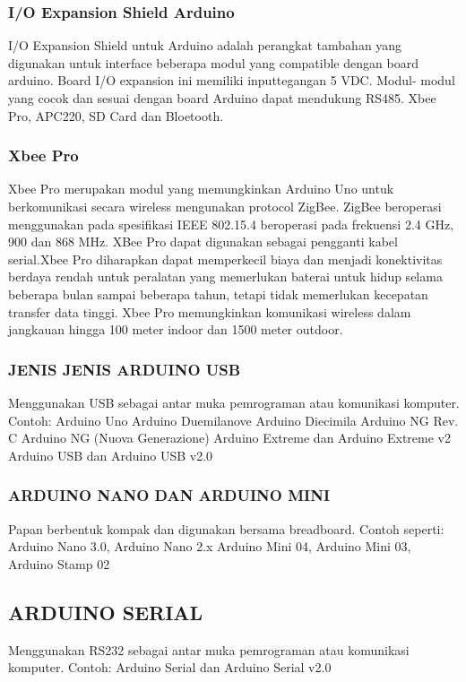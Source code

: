 \subsubsection  {I/O Expansion Shield Arduino}
I/O Expansion Shield untuk Arduino adalah perangkat tambahan yang digunakan untuk interface beberapa modul yang compatible dengan board arduino. Board I/O expansion ini memiliki inputtegangan 5 VDC. Modul- modul yang cocok dan sesuai dengan board Arduino dapat mendukung RS485. Xbee Pro, APC220, SD Card dan Bloetooth.

\subsubsection {Xbee Pro}
 Xbee Pro merupakan modul yang memungkinkan Arduino Uno untuk berkomunikasi secara wireless
mengunakan protocol ZigBee. ZigBee beroperasi menggunakan pada spesifikasi IEEE 802.15.4 beroperasi pada frekuensi
2.4 GHz, 900 dan 868 MHz. XBee Pro dapat digunakan sebagai pengganti kabel serial.Xbee Pro diharapkan dapat memperkecil biaya dan menjadi
konektivitas berdaya rendah untuk peralatan yang memerlukan baterai untuk hidup selama beberapa bulan sampai beberapa tahun, tetapi tidak memerlukan kecepatan transfer data tinggi. Xbee Pro memungkinkan komunikasi wireless dalam jangkauan hingga 100 meter indoor dan 1500 meter outdoor.


\subsubsection {JENIS JENIS ARDUINO USB}
Menggunakan USB sebagai antar muka pemrograman atau komunikasi komputer. Contoh:
Arduino Uno
Arduino Duemilanove
Arduino Diecimila
Arduino NG Rev. C
Arduino NG (Nuova Generazione)
Arduino Extreme dan Arduino Extreme v2
Arduino USB dan Arduino USB v2.0 

\subsubsection {ARDUINO NANO DAN ARDUINO MINI}
Papan berbentuk kompak dan digunakan bersama breadboard. Contoh seperti:
Arduino Nano 3.0, Arduino Nano 2.x
Arduino Mini 04, Arduino Mini 03, Arduino Stamp 02

\subsection {ARDUINO SERIAL}
Menggunakan RS232 sebagai antar muka pemrograman atau komunikasi komputer. Contoh: 
Arduino Serial dan Arduino Serial v2.0  

